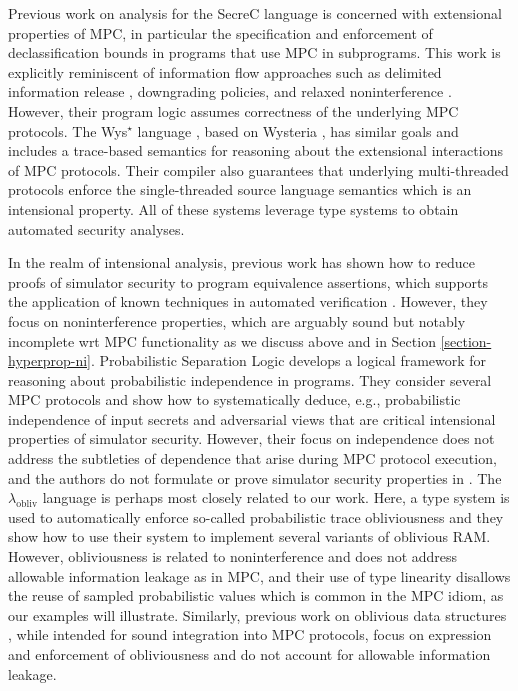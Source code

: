 Previous work on analysis for the SecreC language
\cite{almeida2018enforcing,10.1145/2637113.2637119} is concerned with
extensional properties of MPC, in particular the specification and
enforcement of declassification bounds in programs that use MPC in
subprograms. This work is explicitly reminiscent of information flow
approaches such as delimited information release
\cite{10.1007/978-3-540-37621-7_9}, downgrading policies, and
relaxed noninterference \cite{10.1145/1040305.1040319}. However, their
program logic assumes correctness of the underlying MPC protocols.
The Wys$^\star$ language \cite{wysstar}, based on Wysteria
\cite{rastogi2014wysteria}, has similar goals and includes a
trace-based semantics for reasoning about the extensional interactions
of MPC protocols. Their compiler also guarantees that underlying
multi-threaded protocols enforce the single-threaded source language
semantics which is an intensional property.  All of these systems
leverage type systems to obtain automated security analyses.

In the realm of intensional analysis, previous work has shown how to
reduce proofs of simulator security to program equivalence assertions,
which supports the application of known techniques in automated verification
\cite{8429300}. However, they focus on noninterference properties,
which are arguably sound but notably incomplete wrt MPC functionality
as we discuss above and in Section
\ref{section-hyperprop-ni}. Probabilistic Separation Logic
\cite{barthe2019probabilistic} develops a logical framework for
reasoning about probabilistic independence in programs.  They consider
several MPC protocols and show how to systematically deduce, e.g.,
probabilistic independence of input secrets and adversarial views that
are critical intensional properties of simulator security.  However,
their focus on independence does not address the subtleties of
dependence that arise during MPC protocol execution, and the authors
do not formulate or prove simulator security properties in
\cite{barthe2019probabilistic}. The $\lambda_{\mathrm{obliv}}$
language \cite{darais2019language} is perhaps most closely related to
our work. Here, a type system is used to automatically enforce
so-called probabilistic trace obliviousness and they show how to use
their system to implement several variants of oblivious RAM. However,
obliviousness is related to noninterference and does not address
allowable information leakage as in MPC, and their use of type
linearity disallows the reuse of sampled probabilistic values which is
common in the MPC idiom, as our examples will illustrate. Similarly,
previous work on oblivious data structures \cite{10.1145/3498713},
while intended for sound integration into MPC protocols, focus on
expression and enforcement of obliviousness and do not account
for allowable information leakage.

